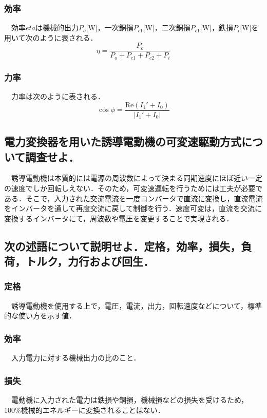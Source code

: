 \subsubsection{効率}
　効率$eta$は機械的出力$P_o$[W]，一次銅損$P_{c1}$[W]，二次銅損$P_{c1}$[W]，鉄損$P_i$[W]を用いて次のように表される．
\begin{equation}
    \eta = \frac{P_o}{P_o + P_{c1} + P_{c2} + P_i}
\end{equation}

\subsubsection{力率}
　力率は次のように表される．
\begin{equation}
    \cos \phi = \frac{\mbox{Re}\left(I_1' + I_0\right)}{\left|I_1' + I_0\right|}
\end{equation}

\subsection{電力変換器を用いた誘導電動機の可変速駆動方式について調査せよ．}
　誘導電動機は本質的には電源の周波数によって決まる同期速度にほぼ近い一定の速度でしか回転しえない．そのため，可変速運転を行うためには工夫が必要である．そこで，入力された交流電流を一度コンバータで直流に変換し，直流電流をインバータを通して再度交流に戻して制御を行う．速度可変は，直流を交流に変換するインバータにて，周波数や電圧を変更することで実現される．

\subsection{次の述語について説明せよ．定格，効率，損失，負荷，トルク，力行および回生．}
\subsubsection{定格}
　誘導電動機を使用する上で，電圧，電流，出力，回転速度などについて，標準的な使い方を示す値．

\subsubsection{効率}
　入力電力に対する機械出力の比のこと．

\subsubsection{損失}
　電動機に入力された電力は鉄損や銅損，機械損などの損失を受けるため，100\%機械的エネルギーに変換されることはない．


